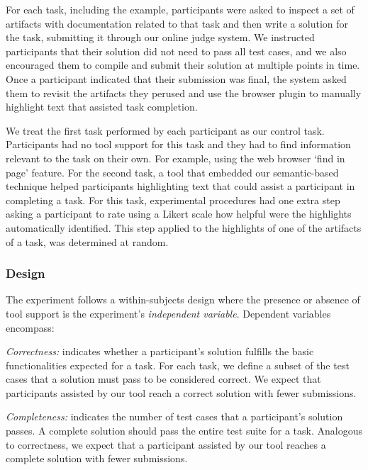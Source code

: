 For each task, including the example, participants were asked to inspect a set of artifacts with documentation related to that task and then write a solution for the task, submitting it through our online judge system. We instructed participants that their solution did not need to pass all test cases, and we also encouraged them to compile and submit their solution at multiple points in time. Once a participant indicated that their submission was final, the system asked them to revisit the artifacts they perused and use the browser plugin to manually highlight text that assisted task completion.


We treat the first task performed by each participant as our control task.
Participants had no tool support for this task and they had to find information relevant to the task on their own. For example, using the web browser `find in page' feature.
For the second task, a tool that embedded our semantic-based technique helped participants 
highlighting text that could assist a participant in completing a task.
For this task, experimental procedures had one extra step asking a participant to rate using a Likert scale how helpful were the highlights automatically identified. This step applied to 
the highlights of one of the artifacts of a task, was determined at random. 







\subsubsection{Design}


The experiment follows a within-subjects design where the presence or absence of tool support is the experiment's \textit{independent variable}.
Dependent variables encompass:


\textit{Correctness:}  indicates whether a participant's solution fulfills the basic functionalities expected for a task. For each task, we define a subset of the test cases that a solution must pass to be considered correct. We expect that participants assisted by our tool reach a correct solution with fewer submissions. 


\textit{Completeness:} indicates the number of test cases that a participant's solution passes. 
A complete solution should pass the entire test suite for a task. Analogous to correctness, we expect that a participant assisted by our tool reaches a complete solution with fewer submissions.


